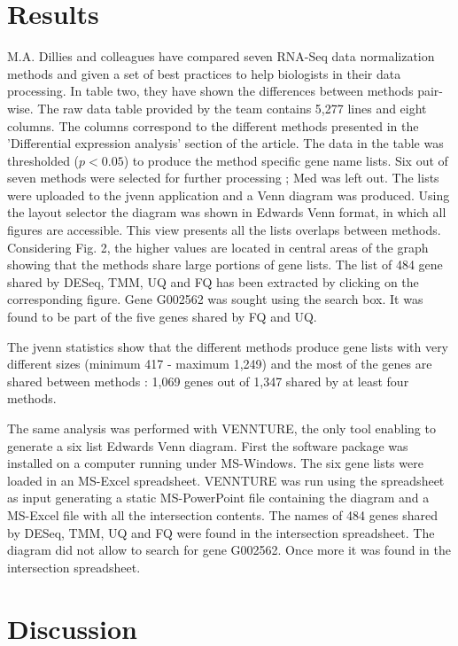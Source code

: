 \documentclass{bmcart}
\begin{document}
\section*{Results}

M.A. Dillies and colleagues \cite{Dillies2012} have compared seven RNA-Seq data
normalization methods and given a set of best practices to help biologists in their 
data processing. In table two, they have shown the differences between methods
pair-wise. The raw data table provided by the team contains 5,277 lines and
eight columns. The columns correspond to  the different methods presented in the
'Differential expression analysis' section of the article. The data in the table
was thresholded ($p < 0.05$) to produce the method specific gene name lists. Six
out of seven methods were selected for further processing ; Med was left out.
The lists were uploaded to the jvenn application and a Venn diagram was
produced. Using the layout selector the diagram was shown in Edwards Venn
format, in which all figures are accessible. This view presents all the lists
overlaps between methods. Considering Fig. 2, the higher values are located in
central areas of the graph showing that the methods share large portions of gene
lists. The list of 484 gene shared by DESeq, TMM, UQ and FQ has been extracted
by clicking on the corresponding figure. Gene G002562 was sought using the
search box. It was found to be part of the five genes shared by FQ and UQ. 

The jvenn statistics show that the different methods produce gene lists with
very different sizes (minimum 417 - maximum 1,249) and the most of the genes are
shared between methods : 1,069 genes out of 1,347 shared by at least four methods.

The same analysis was performed with VENNTURE, the only tool enabling to
generate a six list Edwards Venn diagram. First the software package was
installed on a computer running under MS-Windows. The six gene lists were loaded
in an MS-Excel spreadsheet. VENNTURE was run using the spreadsheet as input
generating a static MS-PowerPoint file containing the diagram and a MS-Excel
file with all the intersection contents. The names of 484 genes shared by DESeq,
TMM, UQ and FQ  were found in the intersection spreadsheet. The diagram did not
allow to search for gene G002562. Once more it was found in the intersection
spreadsheet.

\section*{Discussion}
\end{document}
